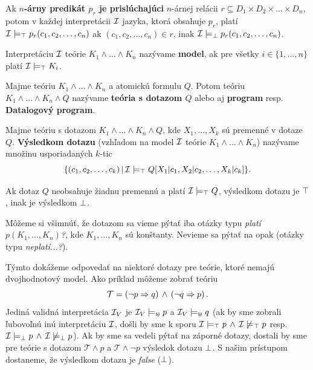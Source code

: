 \begin{definition}
    \label{predikat2relacia}
Ak \textbf{$n$-árny predikát $p_r$ je prislúchajúci} $n$-árnej relácii $r \subseteq D_1 \times D_2
\times \dots \times D_n$, potom v každej interpretácii $\mathcal{I}$ jazyka, ktorá obsahuje $p_r$, platí
$\mathcal{I} \models_\top p_r(c_1, c_2, \dots, c_n)$ ak $(c_1, c_2, \dots, c_n) \in r$, inak $\mathcal{I}
\models_\bot p_r(c_1, c_2, \dots, c_n)$.
\end{definition}

\begin{definition}
Interpretáciu $\mathcal{I}$ teórie $K_1 \land \dots \land K_n$ nazývame \textbf{model}, ak pre všetky $i
\in \{1, \dots, n\}$ platí $\mathcal{I} \models_\top K_i$.
\end{definition}

\begin{definition}
Majme teóriu $K_1 \land \dots \land K_n$ a atomickú formulu $Q$. Potom teóriu $K_1 \land \dots \land
K_n \land Q$ nazývame \textbf{teória s dotazom $Q$} alebo aj \textbf{program} resp.
\textbf{Datalogový program}.
\end{definition}

\begin{definition}
Majme teóriu s dotazom $K_1 \land \dots \land K_n \land Q$, kde $X_1, \dots, X_k$ sú premenné v
dotaze $Q$. \textbf{Výsledkom dotazu} (vzhľadom na model $\mathcal{I}$ teórie $K_1 \land \dots \land
K_n$) nazývame množinu usporiadaných $k$-tic
$$\{(c_1, c_2, \dots, c_k) \, | \, \mathcal{I} \models_\top Q[X_1|c_1, X_2|c_2, \dots ,
X_k|c_k]\}\text{.}$$
    
Ak dotaz $Q$ neobsahuje žiadnu premennú a platí $\mathcal{I} \models_\top Q$, výsledkom dotazu je
$\top$, inak je výsledkom $\bot$.
\end{definition}

\begin{note}
Môžeme si všimnúť, že dotazom sa vieme pýtať iba otázky typu \textit{platí $p(K_1, \dots, K_n)$?},
kde $K_1, \dots, K_n$ sú konštanty. Nevieme sa pýtať na opak (otázky typu \textit{neplatí...?}).
    
Týmto dokážeme odpovedať na niektoré dotazy pre teórie, ktoré nemajú dvojhodnotový model. Ako
príklad môžeme zobrať teóriu
$$\mathcal{T} = \left(\lnot p \Rightarrow q\right)\\
\land\\
\left(\lnot q \Rightarrow p\right)\text{.}$$ Jediná validná interpretácia $\mathcal{I}_V$ je $\mathcal{I}_V
\models_\Cup p$ a $\mathcal{I}_V \models_\Cup q$ (ak by sme zobrali ľubovoľnú inú interpretáciu
$\mathcal{I}$, došli by sme k sporu $\mathcal{I} \models_\top p \, \land \, \mathcal{I} \not\models_\top p$ resp.
$\mathcal{I} \models_\bot p \, \land \, \mathcal{I} \not\models_\bot p$). Ak by sme sa vedeli pýtať na
záporné dotazy, dostali by sme pre teórie s dotazom $\mathcal{T} \land p$ a $\mathcal{T} \land \lnot
p$ výsledok dotazu $\bot$. S našim prístupom dostaneme, že výsledkom dotazu  je \textit{false} ($\bot$).
\end{note}

